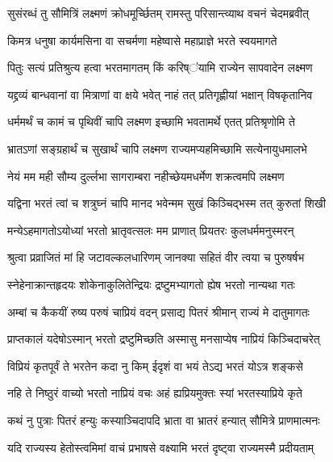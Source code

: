 
\twolineshloka
{सुसंरब्धं तु सौमित्रिं लक्ष्मणं क्रोधमूर्च्छितम्}
{रामस्तु परिसान्त्व्याथ वचनं चेदमब्रवीत्} %

\twolineshloka
{किमत्र धनुषा कार्यमसिना वा सचर्मणा}
{महेष्वासे महाप्राज्ञे भरते स्वयमागते} %

\twolineshloka
{पितुः सत्यं प्रतिश्रुत्य हत्वा भरतमागतम्}
{किं करिष्ऺयामि राज्येन सापवादेन लक्ष्मण} %

\twolineshloka
{यद्द्रव्यं बान्धवानां वा मित्राणां वा क्षये भवेत्}
{नाहं तत् प्रतिगृह्णीयां भक्षान् विषकृतानिव} %

\twolineshloka
{धर्ममर्थं च कामं च पृथिवीं चापि लक्ष्मण}
{इच्छामि भवतामर्थे एतत् प्रतिश्रृणोमि ते} %

\twolineshloka
{भ्रातऽणां सङ्ग्रहार्थं च सुखार्थं चापि लक्ष्मण}
{राज्यमप्यहमिच्छामि सत्येनायुधमालभे} %

\twolineshloka
{नेयं मम मही सौम्य दुर्ल्लभा सागराम्बरा}
{नहीच्छेयमधर्मेण शक्रत्वमपि लक्ष्मण} %

\twolineshloka
{यद्विना भरतं त्वां च शत्रुघ्नं चापि मानद}
{भवेन्मम सुखं किञ्चिद्भस्म तत् कुरुतां शिखी} %

\twolineshloka
{मन्येऽहमागतोऽयोध्यां भरतो भ्रातृवत्सलः}
{मम प्राणात् प्रियतरः कुलधर्ममनुस्मरन्} %

\twolineshloka
{श्रुत्वा प्रव्राजितं मां हि जटावल्कलधारिणम्}
{जानक्या सहितं वीर त्वया च पुरुषर्षभ} %

\twolineshloka
{स्नेहेनाक्रान्तहृदयः शोकेनाकुलितेन्द्रियः}
{द्रष्टुमभ्यागतो ह्येष भरतो नान्यथा गतः} %

\twolineshloka
{अम्बां च कैकयीं रुष्य परुषं चाप्रियं वदन्}
{प्रसाद्य पितरं श्रीमान् राज्यं मे दातुमागतः} %

\twolineshloka
{प्राप्तकालं यदेषोऽस्मान् भरतो द्रष्टुमिच्छति}
{अस्मासु मनसाप्येष नाप्रियं किञ्चिदाचरेत्} %

\twolineshloka
{विप्रियं कृतपूर्वं ते भरतेन कदा नु किम्}
{ईदृशं वा भयं तेऽद्य भरतं योऽत्र शङ्कसे} %

\twolineshloka
{नहि ते निष्ठुरं वाच्यो भरतो नाप्रियं वचः}
{अहं ह्यप्रियमुक्तः स्यां भरतस्याप्रिये कृते} %

\twolineshloka
{कथं नु पुत्राः पितरं हन्युः कस्याञ्चिदापदि}
{भ्राता वा भ्रातरं हन्यात् सौमित्रे प्राणमात्मनः} %

\twolineshloka
{यदि राज्यस्य हेतोस्त्वमिमां वाचं प्रभाषसे}
{वक्ष्यामि भरतं दृष्ट्वा राज्यमस्मै प्रदीयताम्} %

